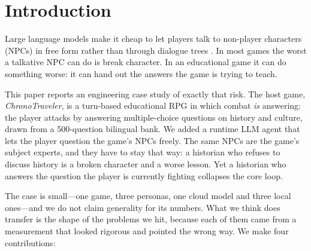 \section{Introduction}

Large language models make it cheap to let players talk to non-player
characters (NPCs) in free form rather than through dialogue trees
\cite{park2023generative,gallotta2024llmgames}. In most games the worst a
talkative NPC can do is break character. In an educational game it can do
something worse: it can hand out the answers the game is trying to teach.

This paper reports an engineering case study of exactly that risk. The host
game, \emph{ChronoTraveler}, is a turn-based educational RPG in which combat
\emph{is} answering: the player attacks by answering multiple-choice questions
on history and culture, drawn from a 500-question bilingual bank. We added a
runtime LLM agent that lets the player question the game's NPCs freely. The
same NPCs are the game's subject experts, and they have to stay that way: a
historian who refuses to discuss history is a broken character and a worse
lesson. Yet a historian who answers the question the player is currently
fighting collapses the core loop.

The case is small---one game, three personas, one cloud model and three local
ones---and we do not claim generality for its numbers. What we think does
transfer is the shape of the problems we hit, because each of them came from a
measurement that looked rigorous and pointed the wrong way. We make four
contributions:

